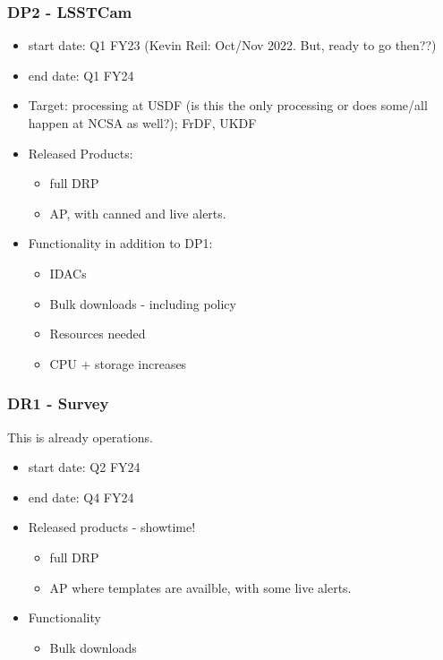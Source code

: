 \subsubsection{DP2 - LSSTCam}
\begin{itemize}
\item start date: Q1 FY23 (Kevin Reil: Oct/Nov 2022. But, ready to go then??)
\item end date: Q1 FY24
\item Target: processing at \gls{USDF} (is this the only processing or does some/all happen at NCSA as well?); FrDF, UKDF
\item Released Products:
\begin{itemize}
\item full \gls{DRP}
\item \gls{AP}, with canned and live alerts.
\end{itemize}
\item Functionality in addition to \gls{DP1}:
\begin{itemize}
\item IDACs
\item Bulk downloads - including policy
\item Resources needed
\item \gls{CPU} + storage increases
\end{itemize}
\end{itemize}
\subsubsection{DR1 - Survey}
This is already operations.

\begin{itemize}
\item start date: Q2 FY24
\item end date: Q4 FY24
\item Released products - showtime!
\begin{itemize}
\item full \gls{DRP}
\item \gls{AP} where templates are availble, with some live alerts.
\end{itemize}
\item Functionality
\begin{itemize}
\item Bulk downloads
\end{itemize}
\end{itemize}
